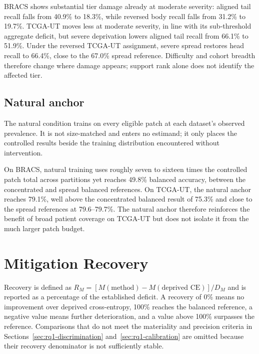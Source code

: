 \documentclass[11pt]{article}
\newcommand{\resultstable}[1]{}
\begin{document}
\begin{table}[ht]
  \centering
  \footnotesize
  \resultstable{tier_endpoints_summary}
  \caption{Selected tier recall (\%). Aligned assigns the fewest patches to the hardest classes; reversed assigns those classes the most patches. Head, body, and tail denote high-, intermediate-, and low-support tiers.}
  \label{tab:tier-endpoints}
\end{table}

\noindent BRACS shows substantial tier damage already at moderate severity: aligned tail recall falls from \num{40.9}\% to \num{18.3}\%, while reversed body recall falls from \num{31.2}\% to \num{19.7}\%. TCGA-UT moves less at moderate severity, in line with its sub-threshold aggregate deficit, but severe deprivation lowers aligned tail recall from \num{66.1}\% to \num{51.9}\%. Under the reversed TCGA-UT assignment, severe spread restores head recall to \num{66.4}\%, close to the \num{67.0}\% spread reference. Difficulty and cohort breadth therefore change where damage appears; support rank alone does not identify the affected tier.

\subsection{Natural anchor}
\label{sec:rq1-routing}
The natural condition trains on every eligible patch at each dataset's observed prevalence. It is not size-matched and enters no estimand; it only places the controlled results beside the training distribution encountered without intervention.

\begin{table}[H]
  \centering
  \footnotesize
  \resultstable{natural_anchor_summary}
  \caption{Natural and balanced cross-entropy anchors.}
  \label{tab:natural-anchor}
\end{table}

\noindent On BRACS, natural training uses roughly seven to sixteen times the controlled patch total across partitions yet reaches \num{49.8}\% balanced accuracy, between the concentrated and spread balanced references. On TCGA-UT, the natural anchor reaches \num{79.1}\%, well above the concentrated balanced result of \num{75.3}\% and close to the spread references at \num{79.6}--\num{79.7}\%. The natural anchor therefore reinforces the benefit of broad patient coverage on TCGA-UT but does not isolate it from the much larger patch budget.

\section{Mitigation Recovery}
\label{sec:rq2}
Recovery is defined as $R_M = [M(\text{method}) - M(\text{deprived CE})] / D_M$ and is reported as a percentage of the established deficit. A recovery of \num{0}\% means no improvement over deprived cross-entropy, \num{100}\% reaches the balanced reference, a negative value means further deterioration, and a value above \num{100}\% surpasses the reference. Comparisons that do not meet the materiality and precision criteria in Sections~\ref{sec:rq1-discrimination} and~\ref{sec:rq1-calibration} are omitted because their recovery denominator is not sufficiently stable.
\end{document}
